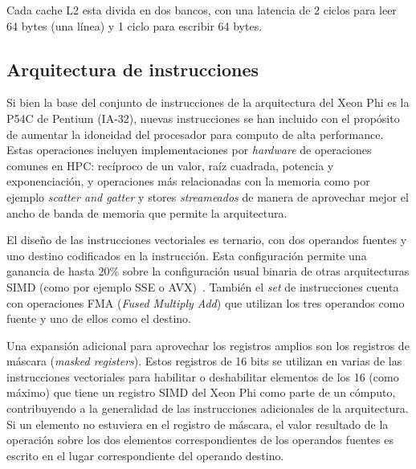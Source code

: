 Cada cache L2 esta divida en dos bancos, con una latencia de 2 ciclos para leer 64 bytes (una l\'inea) y 1 ciclo para escribir 64 bytes.


\subsection{Arquitectura de instrucciones}

Si bien la base del conjunto de instrucciones de la arquitectura del Xeon Phi es la P54C de Pentium (IA-32), nuevas instrucciones se han incluido con el prop\'osito de aumentar la idoneidad del procesador para computo de alta performance.
Estas operaciones incluyen implementaciones por \textit{hardware} de operaciones comunes en HPC: rec\'iproco de un valor,
ra\'iz cuadrada, potencia y exponenciaci\'on, y operaciones m\'as relacionadas con la memoria como por ejemplo \textit{scatter and gatter}
y stores \textit{streameados} de manera de aprovechar mejor el ancho de banda de memoria que permite la arquitectura.

El dise\~no de las instrucciones vectoriales es ternario, con dos operandos fuentes y uno destino codificados en la instrucci\'on.
Esta configuraci\'on permite una ganancia de hasta 20\% sobre la configuraci\'on usual binaria de otras arquitecturas SIMD (como
por ejemplo SSE o AVX)~\cite{BookXeonPhi}. Tambi\'en el \textit{set} de instrucciones cuenta con operaciones FMA (\textit{Fused
Multiply Add}) que utilizan los tres operandos como fuente y uno de ellos como el destino.

Una expansi\'on adicional para aprovechar los registros amplios son los registros de m\'ascara (\textit{masked registers}).
Estos registros de 16 bits se utilizan en varias de las instrucciones vectoriales para habilitar o deshabilitar elementos
de los 16 (como m\'aximo) que tiene un registro SIMD del Xeon Phi como parte de un c\'omputo, contribuyendo a la generalidad de
las instrucciones adicionales de la arquitectura. Si un elemento no estuviera en el registro de m\'ascara, el valor resultado de la operaci\'on
sobre los dos elementos correspondientes de los operandos fuentes es escrito en el lugar correspondiente del operando destino.

